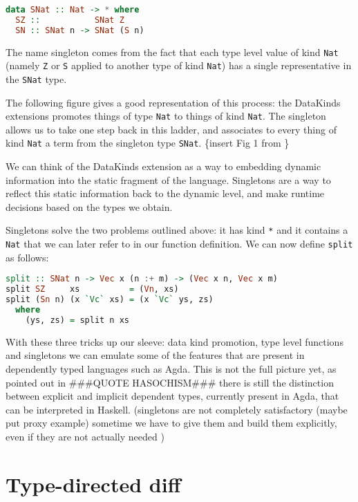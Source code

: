\documentclass[11pt]{article}
\begin{document}
\begin{lstlisting}[language=haskell]
data SNat :: Nat -> * where
  SZ ::           SNat Z
  SN :: SNat n -> SNat (S n)
\end{lstlisting}

The name singleton comes from the fact that each type level value of
kind \texttt{Nat} (namely \texttt{Z} or \texttt{S} applied to another
type of kind \texttt{Nat}) has a single representative in the
\texttt{SNat} type.

The following figure gives a good representation of this process: the
DataKinds extensions promotes things of type \texttt{Nat} to things of
kind \texttt{Nat}. The singleton allows us to take one step back in this
ladder, and associates to every thing of kind \texttt{Nat} a term from
the singleton type \texttt{SNat}. \{insert Fig 1 from
\cite{singletons1}\}


We can think of the DataKinds extension as a way to embedding dynamic information into the static fragment of 
the language. Singletons are a way to reflect this static information back to 
the dynamic level, and make runtime decisions based on the types we obtain.


Singletons solve the two problems outlined above: it has kind \texttt{*}
and it contains a \texttt{Nat} that we can later refer to in our
function definition. We can now define \texttt{split} as follows:

\begin{lstlisting}[language=haskell]
split :: SNat n -> Vec x (n :+ m) -> (Vec x n, Vec x m)
split SZ     xs          = (Vn, xs)
split (Sn n) (x `Vc` xs) = (x `Vc` ys, zs)
  where
    (ys, zs) = split n xs
\end{lstlisting}

With these three tricks up our sleeve: data kind promotion, type level
functions and singletons we can emulate some of the features that are
present in dependently typed languages such as Agda. This is not the
full picture yet, as pointed out in ###QUOTE HASOCHISM### there is
still the distinction between explicit and implicit dependent types,
currently present in Agda, that can be interpreted in Haskell.
(singletons are not completely satisfactory (maybe put proxy example)
sometime we have to give them and build them explicitly, even if they
are not actually needed )

\section{Type-directed diff}\label{type-directed-diff}
\end{document}
